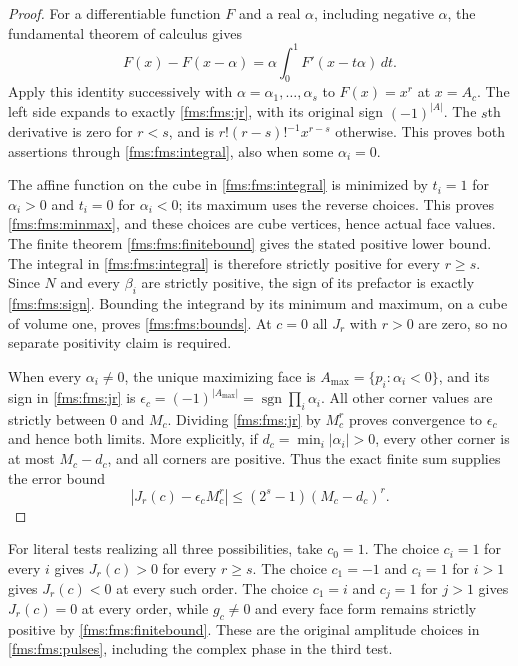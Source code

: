 \documentclass[11pt,a4paper]{article}
\theoremstyle{definition}\newtheorem{definition}[theorem]{Definition}
\providecommand{\sgn}{\operatorname{sgn}}
\begin{document}
\begin{proof}
For a differentiable function $F$ and a real $\alpha$, including
negative $\alpha$, the fundamental theorem of calculus gives
\[
 F(x)-F(x-\alpha)=
       \alpha\int_0^1F'(x-t\alpha)\,dt.
\]
Apply this identity successively with
$\alpha=\alpha_1,\ldots,\alpha_s$ to $F(x)=x^r$ at $x=A_c$.
The left side expands to exactly \eqref{fms:fms:jr}, with its original
sign $(-1)^{|A|}$. The $s$th derivative is zero for $r<s$, and
is $r!(r-s)!^{-1}x^{r-s}$ otherwise. This proves both assertions
through \eqref{fms:fms:integral}, also when some $\alpha_i=0$.

The affine function on the cube in \eqref{fms:fms:integral} is
minimized by $t_i=1$ for $\alpha_i>0$ and $t_i=0$ for
$\alpha_i<0$; its maximum uses the reverse choices.
This proves \eqref{fms:fms:minmax}, and these choices are cube
vertices, hence actual face values. The finite theorem
\eqref{fms:fms:finitebound} gives the stated positive lower bound.
The integral in \eqref{fms:fms:integral} is therefore strictly positive
for every $r\ge s$. Since $N$ and every $\beta_i$ are strictly
positive, the sign of its prefactor is exactly
\eqref{fms:fms:sign}. Bounding the integrand by its minimum and
maximum, on a cube of volume one, proves \eqref{fms:fms:bounds}.
At $c=0$ all $J_r$ with $r>0$ are zero, so no separate positivity
claim is required.

When every $\alpha_i\ne0$, the unique maximizing face is
$A_{\max}=\{p_i:\alpha_i<0\}$, and its sign in
\eqref{fms:fms:jr} is
$\epsilon_c=(-1)^{|A_{\max}|}=\sgn\prod_i\alpha_i$.
All other corner values are strictly between $0$ and $M_c$.
Dividing \eqref{fms:fms:jr} by $M_c^r$ proves convergence to
$\epsilon_c$ and hence both limits. More explicitly, if
$d_c=\min_i|\alpha_i|>0$, every other corner is at most
$M_c-d_c$, and all corners are positive. Thus the exact finite
sum supplies the error bound
\begin{equation}\tag{FMS43}\label{fms:fms:rateerror}
 |J_r(c)-\epsilon_c M_c^r|
       \le(2^s-1)(M_c-d_c)^r.
\end{equation}
\end{proof}

For literal tests realizing all three possibilities, take $c_0=1$.
The choice $c_i=1$ for every $i$ gives $J_r(c)>0$ for every
$r\ge s$. The choice $c_1=-1$ and $c_i=1$ for $i>1$ gives
$J_r(c)<0$ at every such order. The choice $c_1=i$ and
$c_j=1$ for $j>1$ gives $J_r(c)=0$ at every order, while
$g_c\ne0$ and every face form remains strictly positive by
\eqref{fms:fms:finitebound}. These are the original amplitude choices
in \eqref{fms:fms:pulses}, including the complex phase in the third test.
\end{document}
